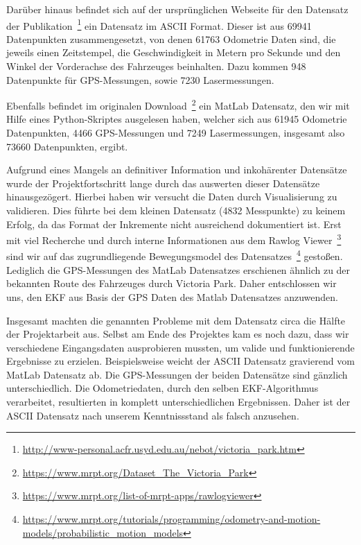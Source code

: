 \documentclass[11pt]{article}
\begin{document}
Darüber hinaus befindet sich auf der ursprünglichen Webseite für den Datensatz der Publikation~\footnote{\url{http://www-personal.acfr.usyd.edu.au/nebot/victoria_park.htm}} ein Datensatz im ASCII Format. Dieser ist aus 69941 Datenpunkten zusammengesetzt, von denen 61763 Odometrie Daten sind, die jeweils einen Zeitstempel, die Geschwindigkeit in Metern pro Sekunde und den Winkel der Vorderachse des Fahrzeuges beinhalten. Dazu kommen 948 Datenpunkte für GPS-Messungen, sowie 7230 Lasermessungen.

Ebenfalls befindet im originalen Download~\footnote{\url{https://www.mrpt.org/Dataset_The_Victoria_Park}} ein MatLab Datensatz, den wir mit Hilfe eines Python-Skriptes ausgelesen haben, welcher sich aus 61945 Odometrie Datenpunkten, 4466 GPS-Messungen und 7249 Lasermessungen, insgesamt also 73660 Datenpunkten, ergibt.

Aufgrund eines Mangels an definitiver Information und inkohärenter Datensätze wurde der Projektfortschritt lange durch das auswerten dieser Datensätze hinausgezögert. Hierbei haben wir versucht die Daten durch Visualisierung zu validieren. Dies führte bei dem kleinen Datensatz (4832 Messpunkte) zu keinem Erfolg, da das Format der Inkremente nicht ausreichend dokumentiert ist. Erst mit viel Recherche und durch interne Informationen aus dem Rawlog Viewer~\footnote{\url{https://www.mrpt.org/list-of-mrpt-apps/rawlogviewer}} sind wir auf das zugrundliegende Bewegungsmodel des Datensatzes~\footnote{\url{https://www.mrpt.org/tutorials/programming/odometry-and-motion-models/probabilistic_motion_models}} gestoßen. Lediglich die GPS-Messungen des MatLab Datensatzes erschienen ähnlich zu der bekannten Route des Fahrzeuges durch Victoria Park. Daher entschlossen wir uns, den EKF aus Basis der GPS Daten des Matlab Datensatzes anzuwenden.

Insgesamt machten die genannten Probleme mit dem Datensatz circa die Hälfte der Projektarbeit aus. Selbst am Ende des Projektes kam es noch dazu, dass wir verschiedene Eingangsdaten ausprobieren mussten, um valide und funktionierende Ergebnisse zu erzielen. Beispielsweise weicht der ASCII Datensatz gravierend vom MatLab Datensatz ab. Die GPS-Messungen der beiden Datensätze sind gänzlich unterschiedlich. Die Odometriedaten, durch den selben EKF-Algorithmus verarbeitet, resultierten in komplett unterschiedlichen Ergebnissen. Daher ist der ASCII Datensatz nach unserem Kenntniss\-stand als falsch anzusehen.
\end{document}
